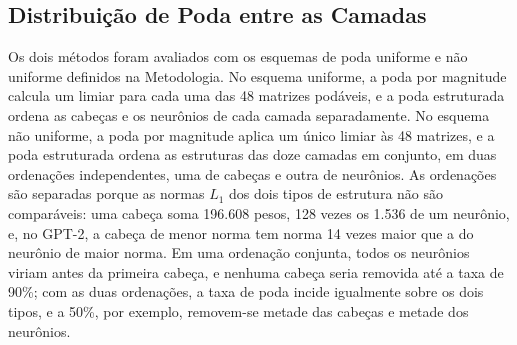 \subsection{Distribuição de Poda entre as Camadas}\label{subsec:escopos}

Os dois métodos foram avaliados com os esquemas de poda uniforme e não uniforme definidos na
Metodologia. No esquema uniforme, a poda por magnitude calcula um
limiar para cada uma das 48 matrizes podáveis, e a poda estruturada ordena as cabeças e os
neurônios de cada camada separadamente. No esquema não uniforme, a poda por magnitude
aplica um único limiar às 48 matrizes, e a poda estruturada ordena as estruturas das doze
camadas em conjunto, em duas ordenações independentes, uma de cabeças e outra de neurônios.
As ordenações são separadas porque as normas $L_1$ dos dois tipos de estrutura não são
comparáveis: uma cabeça soma 196.608 pesos, 128 vezes os 1.536 de um neurônio, e, no GPT-2,
a cabeça de menor norma tem norma 14 vezes maior que a do neurônio de maior norma. Em uma
ordenação conjunta, todos os neurônios viriam antes da primeira cabeça, e nenhuma cabeça
seria removida até a taxa de 90\%; com as duas ordenações, a taxa de poda incide igualmente
sobre os dois tipos, e a 50\%, por exemplo, removem-se metade das cabeças e metade dos
neurônios.

